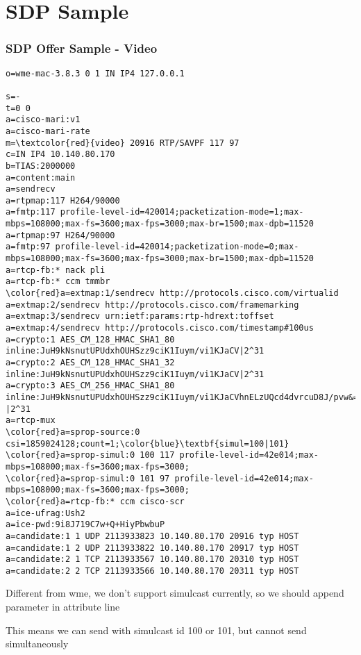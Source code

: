 \documentclass{beamer}
\begin{document}
\section{SDP Sample}
\begin{frame}[fragile]
  \frametitle{SDP Offer Sample - Video}

\begin{center}
  \begin{BVerbatim}[fontfamily=courier, fontsize=\relsize{-5}, commandchars=\\\{\}]
o=wme-mac-3.8.3 0 1 IN IP4 127.0.0.1

s=-
t=0 0
a=cisco-mari:v1
a=cisco-mari-rate
m=\textcolor{red}{video} 20916 RTP/SAVPF 117 97
c=IN IP4 10.140.80.170
b=TIAS:2000000
a=content:main
a=sendrecv
a=rtpmap:117 H264/90000
a=fmtp:117 profile-level-id=420014;packetization-mode=1;max-mbps=108000;max-fs=3600;max-fps=3000;max-br=1500;max-dpb=11520
a=rtpmap:97 H264/90000
a=fmtp:97 profile-level-id=420014;packetization-mode=0;max-mbps=108000;max-fs=3600;max-fps=3000;max-br=1500;max-dpb=11520
a=rtcp-fb:* nack pli
a=rtcp-fb:* ccm tmmbr
\color{red}a=extmap:1/sendrecv http://protocols.cisco.com/virtualid
a=extmap:2/sendrecv http://protocols.cisco.com/framemarking
a=extmap:3/sendrecv urn:ietf:params:rtp-hdrext:toffset
a=extmap:4/sendrecv http://protocols.cisco.com/timestamp#100us
a=crypto:1 AES_CM_128_HMAC_SHA1_80 inline:JuH9kNsnutUPUdxhOUHSzz9ciK1Iuym/vi1KJaCV|2^31
a=crypto:2 AES_CM_128_HMAC_SHA1_32 inline:JuH9kNsnutUPUdxhOUHSzz9ciK1Iuym/vi1KJaCV|2^31
a=crypto:3 AES_CM_256_HMAC_SHA1_80 inline:JuH9kNsnutUPUdxhOUHSzz9ciK1Iuym/vi1KJaCVhnELzUQcd4dvrcuD8J/pvw&=& |2^31
a=rtcp-mux
\color{red}a=sprop-source:0 csi=1859024128;count=1;\color{blue}\textbf{simul=100|101}
\color{red}a=sprop-simul:0 100 117 profile-level-id=42e014;max-mbps=108000;max-fs=3600;max-fps=3000;
\color{red}a=sprop-simul:0 101 97 profile-level-id=42e014;max-mbps=108000;max-fs=3600;max-fps=3000;
\color{red}a=rtcp-fb:* ccm cisco-scr
a=ice-ufrag:Ush2
a=ice-pwd:9i8J719C7w+Q+HiyPbwbuP
a=candidate:1 1 UDP 2113933823 10.140.80.170 20916 typ HOST
a=candidate:1 2 UDP 2113933822 10.140.80.170 20917 typ HOST
a=candidate:2 1 TCP 2113933567 10.140.80.170 20310 typ HOST
a=candidate:2 2 TCP 2113933566 10.140.80.170 20311 typ HOST
\end{BVerbatim}
\end{center}
{
Different from wme, we don't support simulcast currently, so we should append parameter  in  attribute line

This means we can send with simulcast id 100 or 101, but cannot send simultaneously
}
\end{frame}
\end{document}
